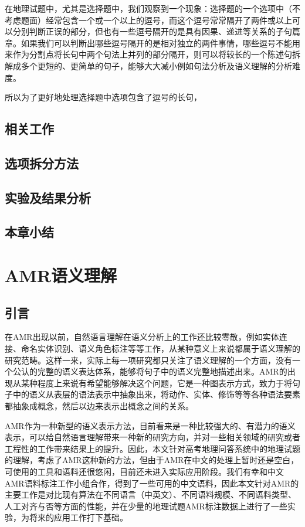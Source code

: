 \documentclass[master, winfont]{njuthesis}
\begin{document}
在地理试题中，尤其是选择题中，我们观察到一个现象：选择题的一个选项中（不考虑题面）经常包含一个或一个以上的逗号，而这个逗号常常隔开了两件或以上可以分别判断正误的部分，但也有一些逗号隔开的是具有因果、递进等关系的子句篇章。如果我们可以判断出哪些逗号隔开的是相对独立的两件事情，哪些逗号不能用来作为分割点将长句中两个句法上并列的部分隔开，则可以将较长的一个陈述句拆解成多个更短的、更简单的句子，能够大大减小例如句法分析及语义理解的分析难度。

所以为了更好地处理选择题中选项包含了逗号的长句，

\section{相关工作}
\section{选项拆分方法}
\section{实验及结果分析}
\section{本章小结}

\chapter{AMR语义理解}
\section{引言}
在AMR出现以前，自然语言理解在语义分析上的工作还比较零散，例如实体连接、命名实体识别、语义角色标注等等工作，从某种意义上来说都属于语义理解的研究范畴。这样一来，实际上每一项研究都只关注了语义理解的一个方面，没有一个公认的完整的语义表达体系，能够将句子中的语义完整地描述出来。AMR的出现从某种程度上来说有希望能够解决这个问题，它是一种图表示方式，致力于将句子中的语义从表层的语法表示中抽象出来，将动作、实体、修饰等等各种语法要素都抽象成概念，然后以边来表示出概念之间的关系。

AMR作为一种新型的语义表示方法，目前看来是一种比较强大的、有潜力的语义表示，可以给自然语言理解带来一种新的研究方向，并对一些相关领域的研究或者工程性的工作带来结果上的提升\cite{kai2015improving}\cite{Pan2015}。因此，本文针对高考地理问答系统中的地理试题的理解，考虑了AMR这种新的方法，但由于AMR在中文的处理上暂时还是空白，可使用的工具和语料还很悠闲，目前还未进入实际应用阶段。我们有幸和中文AMR语料标注工作小组合作，得到了一些可用的中文语料，因此本文针对AMR的主要工作是对比现有算法在不同语言（中英文）、不同语料规模、不同语料类型、人工对齐与否等方面的性能，并在少量的地理试题AMR标注数据上进行了一些实验，为将来的应用工作打下基础。
\end{document}
